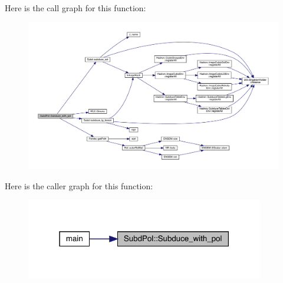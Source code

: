Here is the call graph for this function\+:
\nopagebreak
\begin{figure}[H]
\begin{center}
\leavevmode
\includegraphics[width=350pt]{db/d8a/namespaceSubdPol_ad6ba4f4261604a40b788b2922ed2871e_cgraph}
\end{center}
\end{figure}
Here is the caller graph for this function\+:
\nopagebreak
\begin{figure}[H]
\begin{center}
\leavevmode
\includegraphics[width=295pt]{db/d8a/namespaceSubdPol_ad6ba4f4261604a40b788b2922ed2871e_icgraph}
\end{center}
\end{figure}
